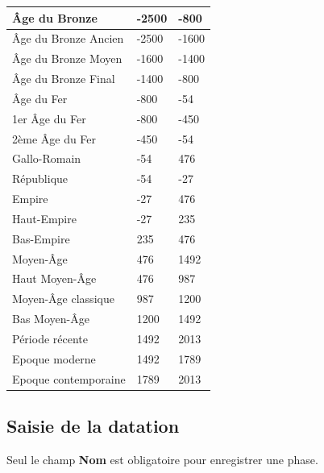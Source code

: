 \documentclass[letterpaper,10pt,french]{sphinxmanual}
\begin{document}
\begin{longtable}{|l|l|l|}
Âge du Bronze
 & 
-2500
 & 
-800
\\\hline

Âge du Bronze Ancien
 & 
-2500
 & 
-1600
\\\hline

Âge du Bronze Moyen
 & 
-1600
 & 
-1400
\\\hline

Âge du Bronze Final
 & 
-1400
 & 
-800
\\\hline

Âge du Fer
 & 
-800
 & 
-54
\\\hline

1er Âge du Fer
 & 
-800
 & 
-450
\\\hline

2ème Âge du Fer
 & 
-450
 & 
-54
\\\hline

Gallo-Romain
 & 
-54
 & 
476
\\\hline

République
 & 
-54
 & 
-27
\\\hline

Empire
 & 
-27
 & 
476
\\\hline

Haut-Empire
 & 
-27
 & 
235
\\\hline

Bas-Empire
 & 
235
 & 
476
\\\hline

Moyen-Âge
 & 
476
 & 
1492
\\\hline

Haut Moyen-Âge
 & 
476
 & 
987
\\\hline

Moyen-Âge classique
 & 
987
 & 
1200
\\\hline

Bas Moyen-Âge
 & 
1200
 & 
1492
\\\hline

Période récente
 & 
1492
 & 
2013
\\\hline

Epoque moderne
 & 
1492
 & 
1789
\\\hline

Epoque contemporaine
 & 
1789
 & 
2013
\\\hline
\end{longtable}



\subsection{Saisie de la datation}
\label{manuel/formulaire_datation:saisie-de-la-datation}
Seul le champ \textbf{Nom} est obligatoire pour enregistrer une phase.
\end{document}
